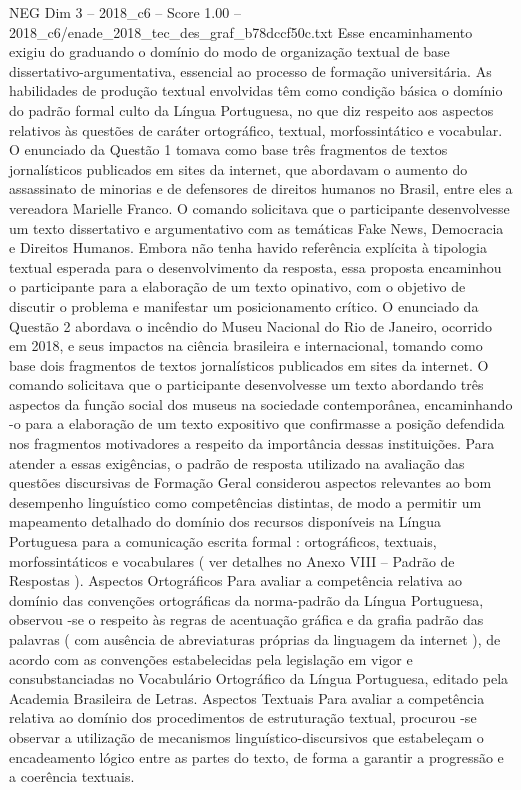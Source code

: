 \begin{textsample}{NEG Dim 3 – 2018\_c6 – Score 1.00 – 2018\_c6/enade\_2018\_tec\_des\_graf\_b78dccf50c.txt}
Esse encaminhamento exigiu do graduando o domínio do modo de organização textual de base dissertativo-argumentativa, essencial ao processo de formação universitária.
As habilidades de produção textual envolvidas têm como condição básica o domínio do padrão formal culto da Língua Portuguesa, no que diz respeito aos aspectos relativos às questões de caráter ortográfico, textual, morfossintático e vocabular.
O enunciado da Questão 1 tomava como base três fragmentos de textos jornalísticos publicados em sites da internet, que abordavam o aumento do assassinato de minorias e de defensores de direitos humanos no Brasil, entre eles a vereadora Marielle Franco.
O comando solicitava que o participante desenvolvesse um texto dissertativo e argumentativo com as temáticas Fake News, Democracia e Direitos Humanos.
Embora não tenha havido referência explícita à tipologia textual esperada para o desenvolvimento da resposta, essa proposta encaminhou o participante para a elaboração de um texto opinativo, com o objetivo de discutir o problema e manifestar um posicionamento crítico.
O enunciado da Questão 2 abordava o incêndio do Museu Nacional do Rio de Janeiro, ocorrido em 2018, e seus impactos na ciência brasileira e internacional, tomando como base dois fragmentos de textos jornalísticos publicados em sites da internet.
O comando solicitava que o participante desenvolvesse um texto abordando três aspectos da função social dos museus na sociedade contemporânea, encaminhando -o para a elaboração de um texto expositivo que confirmasse a posição defendida nos fragmentos motivadores a respeito da importância dessas instituições.
Para atender a essas exigências, o padrão de resposta utilizado na avaliação das questões discursivas de Formação Geral considerou aspectos relevantes ao bom desempenho linguístico como competências distintas, de modo a permitir um mapeamento detalhado do domínio dos recursos disponíveis na Língua Portuguesa para a comunicação escrita formal : ortográficos, textuais, morfossintáticos e vocabulares ( ver detalhes no Anexo VIII – Padrão de Respostas ).
Aspectos Ortográficos Para avaliar a competência relativa ao domínio das convenções ortográficas da norma-padrão da Língua Portuguesa, observou -se o respeito às regras de acentuação gráfica e da grafia padrão das palavras ( com ausência de abreviaturas próprias da linguagem da internet ), de acordo com as convenções estabelecidas pela legislação em vigor e consubstanciadas no Vocabulário Ortográfico da Língua Portuguesa, editado pela Academia Brasileira de Letras.
Aspectos Textuais Para avaliar a competência relativa ao domínio dos procedimentos de estruturação textual, procurou -se observar a utilização de mecanismos linguístico-discursivos que estabeleçam o encadeamento lógico entre as partes do texto, de forma a garantir a progressão e a coerência textuais.

\end{textsample}
